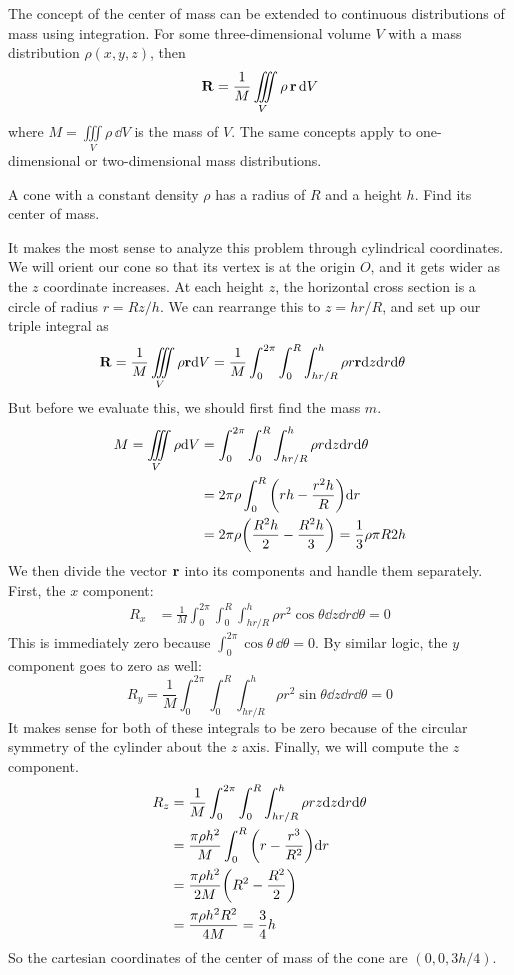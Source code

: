 The concept of the center of mass can be extended to continuous distributions of mass using integration. For some three-dimensional volume $V$ with a mass distribution $\rho(x,y,z)$, then
\[ \mathbf{R} = \frac{1}{M} \iiint\limits_V \rho \, \mathbf{r}\, \dd V \]
where $M = \iiint\limits_V \rho \, \dd V$ is the mass of $V$. The same concepts apply to one-dimensional or two-dimensional mass distributions.
\begin{example}
    A cone with a constant density $\rho$ has a radius of $R$ and a height $h$. Find its center of mass. 

    It makes the most sense to analyze this problem through cylindrical coordinates. We will orient our cone so that its vertex is at the origin $O$, and it gets wider as the $z$ coordinate increases. At each height $z$, the horizontal cross section is a circle of radius $r = Rz/h$. We can rearrange this to $z = hr/R$, and set up our triple integral as 
    \begin{align*}
        \mathbf{R} = \frac{1}{M} \iiint\limits_V \rho \mathbf{r} \dd V &= \frac{1}{M} \int_0^{2\pi}\int_0^{R}\int_{hr/R}^h \rho r \mathbf{r} \dd z \dd r \dd \theta
    \end{align*}
    But before we evaluate this, we should first find the mass $m$.
    \begin{align*}
        M = \iiint\limits_V \rho \dd V &= \int_0^{2\pi}\int_0^R\int_{hr/R}^h \rho r\dd z\dd r\dd \theta \\
        &= 2\pi\rho \int_0^R \pqty{rh - \frac{r^2h}{R}}\dd r \\
        &= 2\pi\rho \pqty{\frac{R^2h}{2} - \frac{R^2h}{3}} = \frac{1}{3}\rho \pi R2 h 
    \end{align*} 
    We then divide the vector $\mathbf{r}$ into its components and handle them separately. First, the $x$ component:
    \begin{align*}
        R_x &= \frac{1}{M} \int_0^{2\pi}\int_0^{R}\int_{hr/R}^h \rho r^2\cos\theta \dd z \dd r \dd \theta = 0  
    \end{align*}
    This is immediately zero because $\int_0^{2\pi}\cos\theta\, \dd\theta = 0$. By similar logic, the $y$ component goes to zero as well:
    \[ R_y = \frac{1}{M} \int_0^{2\pi}\int_0^{R}\int_{hr/R}^h \rho r^2\sin\theta \dd z \dd r \dd \theta = 0  \]
    It makes sense for both of these integrals to be zero because of the circular symmetry of the cylinder about the $z$ axis. Finally, we will compute the $z$ component.
    \begin{align*}
        R_z &= \frac{1}{M} \int_0^{2\pi}\int_0^{R}\int_{hr/R}^h \rho rz \dd z \dd r \dd \theta \\
        &= \frac{\pi\rho h^2}{M} \int_0^R \pqty{r - \frac{r^3}{R^2}} \dd r \\
        &= \frac{\pi \rho h^2}{2M} \pqty{R^2 - \frac{R^2}{2}} \\
        &= \frac{\pi \rho h^2R^2}{4M} = \frac{3}{4}h
    \end{align*}
    So the cartesian coordinates of the center of mass of the cone are $(0, 0, 3h/4)$.
\end{example}
